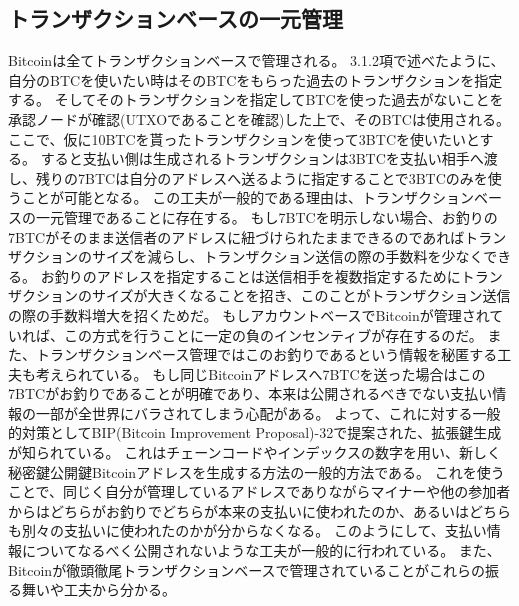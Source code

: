 \subsection{トランザクションベースの一元管理}
Bitcoinは全てトランザクションベースで管理される。
3.1.2項で述べたように、自分のBTCを使いたい時はそのBTCをもらった過去のトランザクションを指定する。
そしてそのトランザクションを指定してBTCを使った過去がないことを承認ノードが確認(UTXOであることを確認)した上で、そのBTCは使用される。
ここで、仮に10BTCを貰ったトランザクションを使って3BTCを使いたいとする。
すると支払い側は生成されるトランザクションは3BTCを支払い相手へ渡し、残りの7BTCは自分のアドレスへ送るように指定することで3BTCのみを使うことが可能となる。
この工夫が一般的である理由は、トランザクションベースの一元管理であることに存在する。
もし7BTCを明示しない場合、お釣りの7BTCがそのまま送信者のアドレスに紐づけられたままできるのであればトランザクションのサイズを減らし、トランザクション送信の際の手数料を少なくできる。
お釣りのアドレスを指定することは送信相手を複数指定するためにトランザクションのサイズが大きくなることを招き、このことがトランザクション送信の際の手数料増大を招くためだ。
もしアカウントベースでBitcoinが管理されていれば、この方式を行うことに一定の負のインセンティブが存在するのだ。
また、トランザクションベース管理ではこのお釣りであるという情報を秘匿する工夫も考えられている。
もし同じBitcoinアドレスへ7BTCを送った場合はこの7BTCがお釣りであることが明確であり、本来は公開されるべきでない支払い情報の一部が全世界にバラされてしまう心配がある。
よって、これに対する一般的対策としてBIP(Bitcoin Improvement Proposal)-32で提案された、拡張鍵生成が知られている。
これはチェーンコードやインデックスの数字を用い、新しく秘密鍵公開鍵Bitcoinアドレスを生成する方法の一般的方法である。
これを使うことで、同じく自分が管理しているアドレスでありながらマイナーや他の参加者からはどちらがお釣りでどちらが本来の支払いに使われたのか、あるいはどちらも別々の支払いに使われたのかが分からなくなる。
このようにして、支払い情報についてなるべく公開されないような工夫が一般的に行われている。
また、Bitcoinが徹頭徹尾トランザクションベースで管理されていることがこれらの振る舞いや工夫から分かる。

